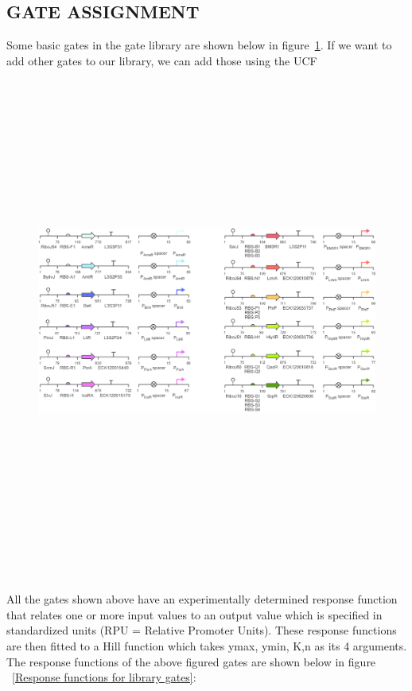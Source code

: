 \documentclass[11pt]{article}
\begin{document}
\subsection*{GATE ASSIGNMENT}
Some basic gates in the gate library are shown below in figure~\ref{Gate Library}. If we want to add other gates to our library, we can add those using the UCF
\begin{figure}[ht!]
\centering
\includegraphics[width=16cm,height=16cm,keepaspectratio]{gate.png}
\label{Gate Library}
\end{figure}
\\[\baselineskip]    
All the gates shown above have an experimentally determined response function that relates one or more input values to an output value which is specified in standardized units (RPU = Relative Promoter Units). These response functions are then fitted to a Hill function which takes ymax, ymin, K,n as its 4 arguments.
The response functions of the above figured gates are shown below in figure ~\ref{Response functions for library gates}: 
\end{document}
